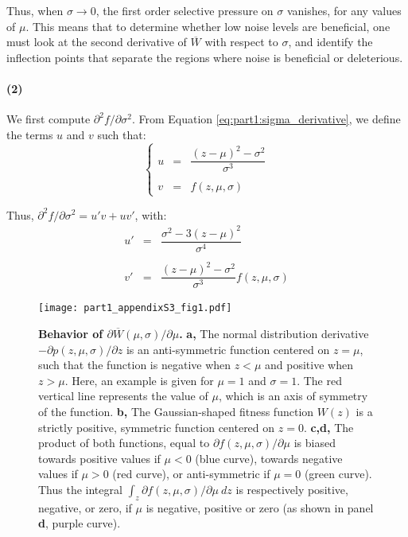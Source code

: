 Thus, when $\sigma \rightarrow 0$, the first order selective pressure on $\sigma$ vanishes, for any values of $\mu$. This means that to determine whether low noise levels are beneficial, one must look at the second derivative of $\overline{W}$ with respect to $\sigma$, and identify the inflection points that separate the regions where noise is beneficial or deleterious.

\paragraph{(2)}

We first compute $\partial^2 f/\partial \sigma^2$. From Equation \ref{eq:part1:sigma_derivative}, we define the terms $u$ and $v$ such that:
\begin{equation}
\left\{
\begin{array}{rcl}
u & = & \dfrac{(z-\mu)^2-\sigma^2}{\sigma^3}\\\\
v & = & f(z,\mu,\sigma)
\end{array}
\right.
\end{equation}

Thus, $\partial^2 f/\partial \sigma^2 = u'v+uv'$, with:
\begin{equation}
\begin{array}{rcl}
u' & = & \dfrac{\sigma^2-3(z-\mu)^2}{\sigma^4}\\\\
v' & = & \dfrac{(z-\mu)^2-\sigma^2}{\sigma^3} f(z,\mu,\sigma)
\end{array}
\end{equation}


\begin{figure}[!h]
\begin{adjustwidth}{-0in}{0in}
\centering
\texttt{[image: part1\_appendixS3\_fig1.pdf]}
\end{adjustwidth}
\caption[Behavior of $\partial \overline{W}(\mu,\sigma)/\partial \mu$.]{
\textbf{Behavior of $\partial \overline{W}(\mu,\sigma)/\partial \mu$.}
\textbf{a,} The normal distribution derivative $-\partial p(z,\mu,\sigma)/\partial z$ is an anti-symmetric function centered on $z=\mu$, such that the function is negative when $z < \mu$ and positive when $z > \mu$. Here, an example is given for $\mu=1$ and $\sigma=1$. The red vertical line represents the value of $\mu$, which is an axis of symmetry of the function.
\textbf{b,} The Gaussian-shaped fitness function $W(z)$ is a strictly positive, symmetric function centered on $z=0$.
\textbf{c,d,} The product of both functions, equal to $\partial f(z,\mu,\sigma)/\partial \mu$ is biased towards positive values if $\mu < 0$ (blue curve), towards negative values if $\mu > 0$ (red curve), or anti-symmetric if $\mu=0$ (green curve). Thus the integral $\int_z \partial f(z,\mu,\sigma)/\partial \mu\ dz$ is respectively positive, negative, or zero, if $\mu$ is negative, positive or zero (as shown in panel \textbf{d}, purple curve).
}
\label{part1:appendixS3:fig1}
\end{figure}

